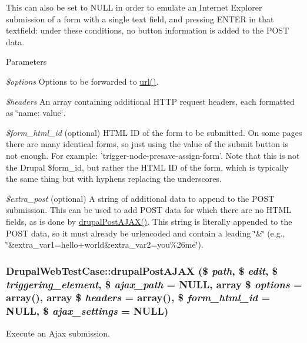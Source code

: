 This can also be set to NULL in order to emulate an Internet Explorer submission of a form with a single text field, and pressing ENTER in that textfield: under these conditions, no button information is added to the POST data. 
\begin{DoxyParams}{Parameters}
\item[{\em \$options}]Options to be forwarded to \hyperlink{common_8inc_a43b2a0594431556db49df980801d8807}{url()}. \item[{\em \$headers}]An array containing additional HTTP request headers, each formatted as \char`\"{}name: value\char`\"{}. \item[{\em \$form\_\-html\_\-id}](optional) HTML ID of the form to be submitted. On some pages there are many identical forms, so just using the value of the submit button is not enough. For example: 'trigger-\/node-\/presave-\/assign-\/form'. Note that this is not the Drupal \$form\_\-id, but rather the HTML ID of the form, which is typically the same thing but with hyphens replacing the underscores. \item[{\em \$extra\_\-post}](optional) A string of additional data to append to the POST submission. This can be used to add POST data for which there are no HTML fields, as is done by \hyperlink{classDrupalWebTestCase_a20ccc6595e0280dbff604c4f536ed6df}{drupalPostAJAX()}. This string is literally appended to the POST data, so it must already be urlencoded and contain a leading \char`\"{}\&\char`\"{} (e.g., \char`\"{}\&extra\_\-var1=hello+world\&extra\_\-var2=you\%26me\char`\"{}). \end{DoxyParams}
\hypertarget{classDrupalWebTestCase_a20ccc6595e0280dbff604c4f536ed6df}{
\subsubsection[{drupalPostAJAX}]{\setlength{\rightskip}{0pt plus 5cm}DrupalWebTestCase::drupalPostAJAX (\$ {\em path}, \/  \$ {\em edit}, \/  \$ {\em triggering\_\-element}, \/  \$ {\em ajax\_\-path} = {\ttfamily NULL}, \/  array \$ {\em options} = {\ttfamily array()}, \/  array \$ {\em headers} = {\ttfamily array()}, \/  \$ {\em form\_\-html\_\-id} = {\ttfamily NULL}, \/  \$ {\em ajax\_\-settings} = {\ttfamily NULL})}}
\label{classDrupalWebTestCase_a20ccc6595e0280dbff604c4f536ed6df}
Execute an Ajax submission.

